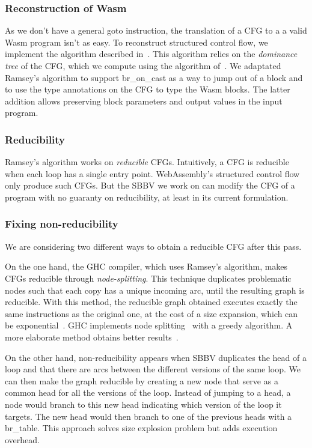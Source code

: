 \documentclass[a4paper,11pt]{article}
\begin{document}
\subsubsection{Reconstruction of Wasm}
As we don't have a general goto instruction, the translation of a CFG to a a
valid Wasm program isn't as easy. To reconstruct structured control flow, we
implement the algorithm described in~\cite{ramsey2022beyond}. This algorithm
relies on the \emph{dominance tree} of the CFG, which we compute using the
algorithm of~\cite{cooper2001simple}. We adaptated Ramsey's algorithm to support
\textsf{br\_on\_cast} as a way to jump out of a block and to use the type
annotations on the CFG to type the Wasm blocks. The latter addition allows
preserving block parameters and output values in the input program.

\subsubsection{Reducibility}
Ramsey's algorithm works on \emph{reducible} CFGs. Intuitively, a CFG is
reducible when each loop has a single entry point. WebAssembly's structured
control flow only produce such CFGs. But the SBBV we work on can modify the CFG
of a program with no guaranty on reducibility, at least in its current
formulation.

\subsubsection{Fixing non-reducibility}
We are considering two different ways to obtain a reducible CFG after this pass.

On the one hand, the GHC compiler, which uses Ramsey's algorithm, makes CFGs
reducible through \emph{node-splitting}. This technique duplicates problematic
nodes such that each copy has a unique incoming arc, until the resulting graph
is reducible. With this method, the reducible graph obtained executes exactly
the same instructions as the original one, at the cost of a size expansion,
which can be exponential~\cite{carter2003folklore}. GHC implements node
splitting~\cite[Appendix~A]{ramsey2022beyond} with a greedy algorithm. A more
elaborate method obtains better results~\cite{janssen1997making}.

On the other hand, non-reducibility appears when SBBV duplicates the head of a
loop and that there are arcs between the different versions of the same loop. We
can then make the graph reducible by creating a new node that serve as a common
head for all the versions of the loop. Instead of jumping to a head, a node
would branch to this new head indicating which version of the loop it targets.
The new head would then branch to one of the previous heads with a
\textsf{br\_table}. This approach solves size explosion problem but adds
execution overhead.
\end{document}
